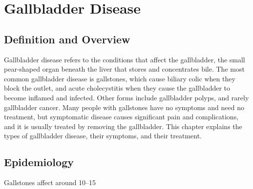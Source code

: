 \chapter{Gallbladder Disease}

\section*{Definition and Overview}
Gallbladder disease refers to the conditions that affect the gallbladder, the small pear-shaped organ beneath the liver that stores and concentrates bile. The most common gallbladder disease is gallstones, which cause biliary colic when they block the outlet, and acute cholecystitis when they cause the gallbladder to become inflamed and infected. Other forms include gallbladder polyps, and rarely gallbladder cancer. Many people with gallstones have no symptoms and need no treatment, but symptomatic disease causes significant pain and complications, and it is usually treated by removing the gallbladder. This chapter explains the types of gallbladder disease, their symptoms, and their treatment.

\section*{Epidemiology}
Gallstones affect around 10--15%

